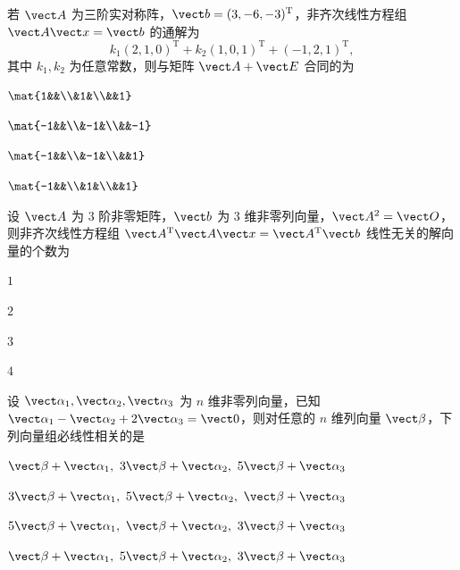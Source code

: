 \begin{question}[index=5]
若 $\vect A$ 为三阶实对称阵，$\vect b=(3,-6,-3)^{\mathrm T}$，非齐次线性方程组 $\vect A\vect x=\vect b$ 的通解为
\[
k_1(2,1,0)^{\mathrm T}+k_2(1,0,1)^{\mathrm T}+(-1,2,1)^{\mathrm T},
\]
其中 $k_1,k_2$ 为任意常数，则与矩阵 $\vect A+\vect E$ 合同的为
\begin{choices}[columns=2]
\item $\mat{1&&\\&1&\\&&1}$
\item $\mat{-1&&\\&-1&\\&&-1}$
\item $\mat{-1&&\\&-1&\\&&1}$
\item $\mat{-1&&\\&1&\\&&1}$
\end{choices}
\end{question}
\QuestionBreak

\begin{question}[index=6]
设 $\vect A$ 为 $3$ 阶非零矩阵，$\vect b$ 为 $3$ 维非零列向量，$\vect A^2=\vect O$，则非齐次线性方程组 $\vect A^{\mathrm T}\vect A\vect x=\vect A^{\mathrm T}\vect b$ 线性无关的解向量的个数为
\begin{choices}[columns=4]
\item $1$
\item $2$
\item $3$
\item $4$
\end{choices}
\end{question}
\QuestionBreak

\begin{question}[index=7]
设 $\vect\alpha_1,\vect\alpha_2,\vect\alpha_3$ 为 $n$ 维非零列向量，已知 $\vect\alpha_1-\vect\alpha_2+2\vect\alpha_3=\vect0$，则对任意的 $n$ 维列向量 $\vect\beta$，下列向量组必线性相关的是
\begin{choices}[columns=2]
\item $\vect\beta+\vect\alpha_1,\ 3\vect\beta+\vect\alpha_2,\ 5\vect\beta+\vect\alpha_3$
\item $3\vect\beta+\vect\alpha_1,\ 5\vect\beta+\vect\alpha_2,\ \vect\beta+\vect\alpha_3$
\item $5\vect\beta+\vect\alpha_1,\ \vect\beta+\vect\alpha_2,\ 3\vect\beta+\vect\alpha_3$
\item $\vect\beta+\vect\alpha_1,\ 5\vect\beta+\vect\alpha_2,\ 3\vect\beta+\vect\alpha_3$
\end{choices}
\end{question}
\QuestionBreak

